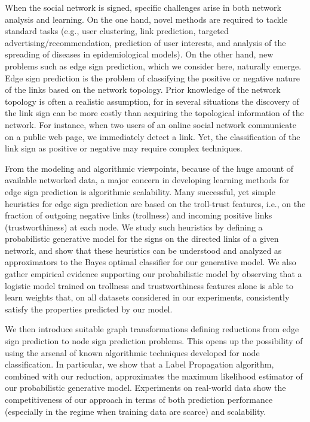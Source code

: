 When the social network is signed, specific challenges arise in both network analysis and learning.
On the one hand, novel methods are required to tackle standard tasks (e.g., user clustering, link
prediction, targeted advertising/recommendation, prediction of user interests, and analysis of the
spreading of diseases in epidemiological models). On the other hand, new problems such as edge sign
prediction, which we consider here, naturally emerge. Edge sign prediction is the problem of
classifying the positive or negative nature of the links based on the network topology. Prior
knowledge of the network topology is often a realistic assumption, for in several situations the
discovery of the link sign can be more costly than acquiring the topological information of the
network. For instance, when two users of an online social network communicate on a public web page,
we immediately detect a link. Yet, the classification of the link sign as positive or negative may
require complex techniques. 

From the modeling and algorithmic viewpoints, because of the huge amount of available networked
data, a major concern in developing learning methods for edge sign prediction is algorithmic
scalability. Many successful, yet simple heuristics for edge sign prediction are based on the
troll-trust features, i.e., on the fraction of outgoing negative links (trollness) and incoming
positive links (trustworthiness) at each node. We study such heuristics by defining a probabilistic
generative model for the signs on the directed links of a given network, and show that these
heuristics can be understood and analyzed as approximators to the Bayes optimal classifier for our
generative model. We also gather empirical evidence supporting our probabilistic model by observing
that a logistic model trained on trollness and trustworthiness features alone is able to learn
weights that, on all datasets considered in our experiments, consistently satisfy the properties
predicted by our model.

We then introduce suitable graph transformations defining reductions from edge sign prediction to
node sign prediction problems. This opens up the possibility of using the arsenal of known
algorithmic techniques developed for node classification. In particular, we show that a Label
Propagation algorithm, combined with our reduction, approximates the maximum likelihood estimator
of our probabilistic generative model. Experiments on real-world data show the competitiveness of
our approach in terms of both prediction performance (especially in the regime when training data
are scarce) and scalability.

